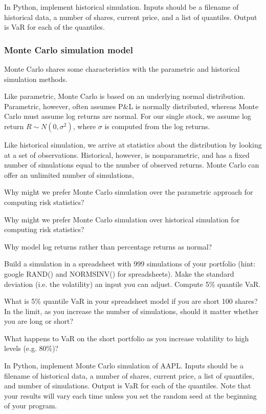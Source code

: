 \documentclass{report}
\numberwithin{problem}{chapter} %
\let\oldroblem\problem
\renewcommand{\problem}{ \oldroblem  \normalfont}
\newcommand{\pnl}{P\&L }
\begin{document}
\problem In Python, implement historical simulation. Inputs should be a filename of historical data, a number of shares, current price, and a list of quantiles. Output is VaR for each of the quantiles. 

\subsubsection{Monte Carlo simulation model}
Monte Carlo shares some characteristics with the parametric and historical simulation methods. 

Like parametric, Monte Carlo is based on an underlying normal distribution. Parametric, however, often assumes \pnl is normally distributed, whereas Monte Carlo must assume log returns are normal. For our single stock, we assume log return $R \sim N(0, \sigma^2)$, where $\sigma$ is computed from the log returns. 

Like historical simulation, we arrive at statistics about the distribution by looking at a set of observations. Historical, however, is nonparametric, and has a fixed number of simulations equal to the number of observed returns. Monte Carlo can offer an unlimited number of simulations,

\problem Why might we prefer Monte Carlo simulation over the parametric approach for computing risk statistics?

\problem Why might we prefer Monte Carlo simulation over historical simulation for computing risk statistics?

\problem Why model log returns rather than percentage returns as normal?

\problem Build a simulation in a spreadsheet with 999 simulations of your portfolio (hint: google RAND() and NORMSINV() for spreadsheets). Make the standard deviation (i.e. the volatility) an input you can adjust.  Compute 5\% quantile VaR. 

\problem What is 5\% quantile VaR in your spreadsheet model if you are \gls{short} 100 shares? In the limit, as you increase the number of simulations, should it matter whether you are long or short? 

\problem What happens to VaR on the short portfolio as you increase volatility to high levels (e.g. 80\%)?

\problem In Python, implement Monte Carlo simulation of AAPL. Inputs should be a filename of historical data, a number of shares, current price, a list of quantiles, and number of simulations. Output is VaR for each of the quantiles. Note that your results will vary each time unless you set the random seed at the beginning of your program.
\end{document}
